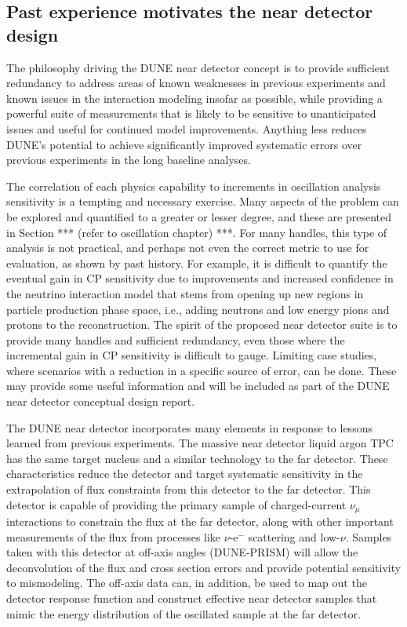 \subsection{Past experience motivates the near detector design}
\label{ssec:exsum-nd-overview-experience}

The philosophy driving the DUNE near detector concept is to provide sufficient redundancy to address areas of known weaknesses in previous experiments and known issues in the interaction modeling insofar as possible, while providing a powerful suite of measurements that is likely to be sensitive to unanticipated issues and useful for continued model improvements.  Anything less reduces DUNE's potential to achieve significantly improved systematic errors over previous experiments in the long baseline analyses. 

The correlation of each physics capability to increments in oscillation analysis sensitivity is a tempting and necessary exercise.  Many aspects of the problem can be explored and quantified to a greater or lesser degree, and these are presented in Section *** (refer to oscillation chapter) ***.  For many handles, this type of analysis is not practical, and perhaps not even the correct metric to use for evaluation, as shown by past history. For example, it is difficult to quantify the eventual gain in CP sensitivity due to improvements and increased confidence in the neutrino interaction model that stems from opening up new regions in particle production phase space, i.e., adding neutrons and low energy pions and protons to the reconstruction.  The spirit of the proposed near detector suite is to provide many handles and sufficient redundancy, even those where the incremental gain in CP sensitivity is difficult to gauge. Limiting case studies, where scenarios with a reduction in a specific source of error, can be done. These may provide some useful information and will be included as part of the DUNE near detector conceptual design report.  

The DUNE near detector incorporates many elements in response to lessons learned from previous experiments. 
The massive near detector liquid argon TPC has the same target nucleus and a similar technology to the far detector. These characteristics reduce the detector and target systematic sensitivity in the  extrapolation of flux constraints from this detector to the far detector.  This detector is capable of providing the primary  sample of charged-current $\nu_{\mu}$ interactions to constrain the flux at the far detector, along with other important measurements of the flux from processes like $\nu$-e$^{-}$ scattering and low-$\nu$.  Samples taken with this detector at off-axis angles (DUNE-PRISM) will allow the deconvolution of the flux and cross section errors and provide potential sensitivity to mismodeling.  The off-axis data can, in addition, be used to map out the detector response function and construct effective near detector samples that mimic the energy distribution of the oscillated sample at the far detector. 

